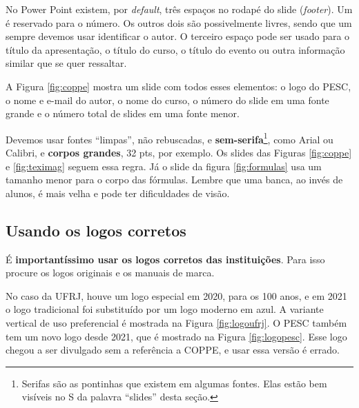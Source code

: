 No Power Point existem, por \textit{default}, três espaços no rodapé do slide (\textit{footer}). Um é reservado para o número. Os outros dois são possivelmente livres, sendo que um  sempre devemos usar identificar o autor. O terceiro espaço pode ser usado para o título da apresentação, o título do curso, o título do evento ou outra informação similar que se quer ressaltar.

A Figura \ref{fig:coppe} mostra um slide com todos esses elementos: o logo do PESC, o nome e e-mail do autor, o nome do curso, o número do slide em uma fonte grande e o número total de slides em uma fonte menor.



Devemos usar fontes ``limpas'', não rebuscadas, e \textbf{sem-serifa}\footnote{Serifas são as pontinhas que existem em algumas fontes. Elas estão bem visíveis no S da palavra ``slides'' desta seção.}, como Arial ou Calibri, e \textbf{corpos grandes}, 32 pts, por exemplo. Os slides das Figuras \ref{fig:coppe} e \ref{fig:teximag} seguem essa regra. Já o slide da figura \ref{fig:formulas} usa um tamanho menor para o corpo das fórmulas. Lembre que uma banca, ao invés de alunos, é mais velha e pode ter dificuldades de visão.





\subsection{Usando os logos corretos}

É \textbf{importantíssimo usar os logos corretos das instituições}. Para isso procure os logos originais e os manuais de marca.

No caso da UFRJ, houve um logo especial em 2020, para os 100 anos, e em 2021 o logo tradicional foi substituído por um logo moderno em azul. A variante vertical de uso preferencial é mostrada na Figura \ref{fig:logoufrj}. O PESC também tem um novo logo desde 2021, que é mostrado na Figura \ref{fig:logopesc}. Esse logo chegou a ser divulgado sem a referência a COPPE, e usar essa versão é errado.

